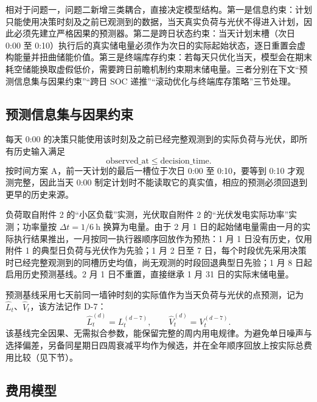 \documentclass[withoutpreface,bwprint]{cumcmthesis}
\begin{document}
相对于问题一，问题二新增三类耦合，直接决定模型结构。第一是信息约束：计划只能使用决策时刻及之前已观测到的数据，当天真实负荷与光伏不得进入计划，因此必须先建立严格因果的预测器。第二是跨日状态约束：当天计划末槽（次日 0:00 至 0:10）执行后的真实储电量必须作为次日的实际起始状态，逐日重置会虚构能量并扭曲储能价值。第三是终端库存约束：若每天只优化当天，模型会在期末耗空储能换取虚假低价，需要跨日前瞻机制约束期末储电量。三者分别在下文“预测信息集与因果约束”“跨日 SOC 递推”“滚动优化与终端库存策略”三节处理。

\subsection{预测信息集与因果约束}

每天 0:00 的决策只能使用该时刻及之前已经完整观测到的实际负荷与光伏，即所有历史输入满足
\begin{equation}
\mathrm{observed\_at}\le \mathrm{decision\_time}.
\label{eq:q2_causal}
\end{equation}
按时间方案 A，前一天计划的最后一槽位于次日 0:00 至 0:10，要等到 0:10 才观测完整，因此当天 0:00 制定计划时不能读取它的真实值，相应的预测必须回退到更早的历史来源。

负荷取自附件 2 的“小区负载”实测，光伏取自附件 2 的“光伏发电实际功率”实测；功率量按 $\Delta t=1/6\ \mathrm{h}$ 换算为电量。由于 2 月 1 日的起始储电量需由一月的实际执行结果推出，一月按同一执行器顺序回放作为预热：1 月 1 日没有历史，仅用附件 1 的典型日负荷与光伏作为先验；1 月 2 日至 7 日，每个时段优先采用决策时已经完整观测到的同槽历史均值，尚无观测的时段回退典型日先验；1 月 8 日起启用历史预测基线。2 月 1 日不重置，直接继承 1 月 31 日的实际末储电量。

预测基线采用七天前同一墙钟时刻的实际值作为当天负荷与光伏的点预测，记为 $\hat L_t$、$\hat V_t$，该方法记作 D-7：
\begin{equation}
\hat L_t^{(d)}=L_t^{(d-7)},\qquad \hat V_t^{(d)}=V_t^{(d-7)}.
\label{eq:q2_forecast}
\end{equation}
该基线完全因果、无需拟合参数，能保留完整的周内用电规律。为避免单日噪声与选择偏差，另备同星期日四周衰减平均作为候选，并在全年顺序回放上按实际总费用比较（见下节）。

\subsection{费用模型}
\end{document}
